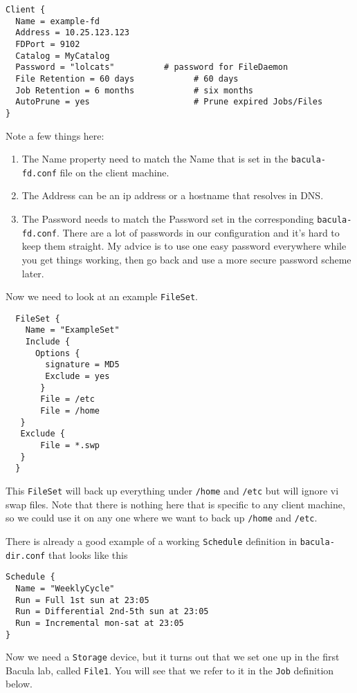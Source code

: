 \documentclass{article}   	%
\begin{document}
\begin{verbatim}
Client {
  Name = example-fd
  Address = 10.25.123.123
  FDPort = 9102
  Catalog = MyCatalog
  Password = "lolcats"          # password for FileDaemon
  File Retention = 60 days            # 60 days
  Job Retention = 6 months            # six months
  AutoPrune = yes                     # Prune expired Jobs/Files
}
\end{verbatim}

Note a few things here:
\begin{enumerate}
  \item The Name property need to match the Name that is set in the \texttt{bacula-fd.conf} file on the client machine.
  \item The Address can be an ip address or a hostname that resolves in DNS.
  \item The Password needs to match the Password set in the corresponding \texttt{bacula-fd.conf}. There are a lot of passwords
  in our configuration and it's hard to keep them straight. My advice is to use one easy password everywhere while you get things working,
  then go back and use a more secure password scheme later.
\end{enumerate}
 
\newpage

Now we need to look at an example \texttt{FileSet}.
  
  \begin{verbatim}
  FileSet {
    Name = "ExampleSet"
    Include {
      Options {
        signature = MD5
        Exclude = yes
       }
       File = /etc
       File = /home
   }
   Exclude {
       File = *.swp
   }
  }
  \end{verbatim}
  
This \texttt{FileSet} will back up everything under \texttt{/home} and \texttt{/etc} but will ignore vi swap files. Note that there is nothing 
here that is specific to any client machine, so we could use it on any one where we want to back up \texttt{/home} and \texttt{/etc}.
 
There is already a good example of a working \texttt{Schedule} definition in \texttt{bacula-dir.conf} that looks like this

\begin{verbatim}
Schedule {
  Name = "WeeklyCycle"
  Run = Full 1st sun at 23:05
  Run = Differential 2nd-5th sun at 23:05
  Run = Incremental mon-sat at 23:05
}
\end{verbatim}

Now we need a \texttt{Storage} device, but it turns out that we set one up in the first Bacula lab, called \texttt{File1}.
You will see that we refer to it in the \texttt{Job} definition below.
\end{document}
